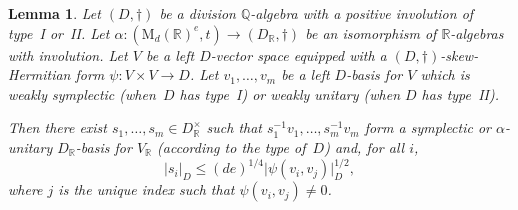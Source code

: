 \documentclass[11pt]{article}
\numberwithin{equation}{section}
\newcommand{\bQ}{\mathbb{Q}}
\newcommand{\bR}{\mathbb{R}}
\newcommand{\rM}{\mathrm{M}}
\newcommand{\abs}[1]{\lvert #1 \rvert}
\newtheorem{lemma}{Lemma}[section]
\begin{document}
\begin{lemma} \label{semi-orthogonal-normalise}
Let $(D,\dag)$ be a division $\bQ$-algebra with a positive involution of type~I or~II.
Let $\alpha \colon (\rM_d(\bR)^e,t) \to (D_\bR,\dag)$ be an isomorphism of $\bR$-algebras with involution.
Let $V$ be a left $D$-vector space equipped with a $(D,\dag)$-skew-Hermitian form \hbox{$\psi \colon V \times V \to D$}.
Let $v_1, \dotsc, v_m$ be a left $D$-basis for $V$ which is weakly symplectic (when~$D$ has type~I) or weakly unitary (when $D$ has type~II).

Then there exist $s_1, \dotsc, s_m \in D_\bR^\times$
such that $s_1^{-1} v_1, \dotsc, s_m^{-1} v_m$ form a symplectic or $\alpha$-unitary $D_\bR$-basis for $V_\bR$ (according to the type of~$D$) and, for all $i$,
\[
\abs{s_i}_D \leq (de)^{1/4} \abs{\psi(v_i, v_j)}_D^{1/2},
\]
where $j$ is the unique index such that $\psi(v_i, v_j) \neq 0$.
\end{lemma}
\end{document}
